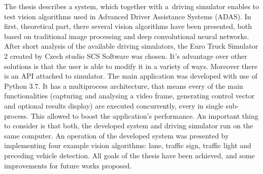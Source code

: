 The thesis describes a system, which together with a~driving simulator enables to test vision algorithms used in Advanced Driver Assistance Systems (ADAS).
In first, theoretical part, there several vision algorithms have been presented, both based on traditional image processing and deep convolutional neural networks.
After short analysis of the available driving simulators, the Euro Truck Simulator 2 created by Czech studio SCS Software was chosen.
It's advantage over other solutions is that the user is able to modify it in a variety of ways. 
Moreover there is an API attached to simulator.
The main application was developed with use of Python 3.7.
It has a multiprocess architecture, that means every of the main functionalities (capturing and analysing a video frame, generating control vector and optional results display) are executed concurrently, every in single sub-process.
This allowed to boost the application's performance. 
An important thing to consider is that both, the developed system and driving simulator run on the same computer.
An operation of the developed system was presented by implementing four example vision algorithms: lane, traffic sign, traffic light and preceding vehicle detection. 
All goals of the thesis have been achieved, and some improvements for future works proposed.